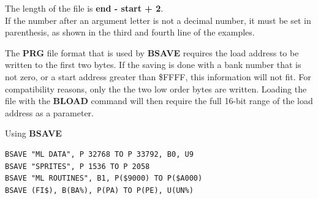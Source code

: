 \begin{description}[leftmargin=2cm,style=nextline]
\item [Remarks:]
   The length of the file is {\bf end - start + 2}. \\
   If the number after an argument letter is not a decimal
   number, it must be set in parenthesis, as shown
   in the third and fourth line of the examples.

   The {\bf PRG} file format that is used by {\bf BSAVE}
   requires the load address to be written to the first two bytes.
   If the saving is done with a bank number that is not zero,
   or a start address greater than \$FFFF, this information will not
   fit. For compatibility reasons, only the the two low order bytes
   are written. Loading the file with the {\bf BLOAD} command will then
   require the full 16-bit range of the load address as a parameter.

\item [Examples:] Using {\bf BSAVE}
\begin{tcolorbox}[colback=black,coltext=white]
\verbatimfont{\codefont}
\begin{verbatim}
BSAVE "ML DATA", P 32768 TO P 33792, B0, U9
BSAVE "SPRITES", P 1536 TO P 2058
BSAVE "ML ROUTINES", B1, P($9000) TO P($A000)
BSAVE (FI$), B(BA%), P(PA) TO P(PE), U(UN%)
\end{verbatim}
\end{tcolorbox}
\end{description}


\newpage
